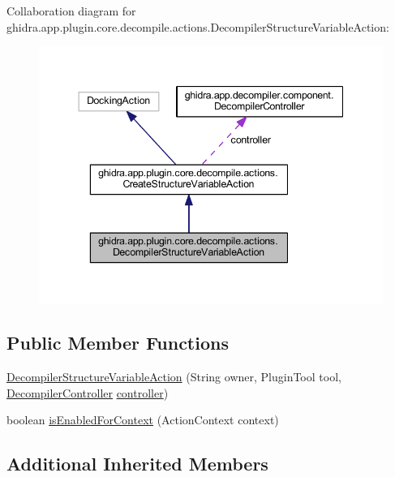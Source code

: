 Collaboration diagram for ghidra.\+app.\+plugin.\+core.\+decompile.\+actions.\+Decompiler\+Structure\+Variable\+Action\+:
\nopagebreak
\begin{figure}[H]
\begin{center}
\leavevmode
\includegraphics[width=344pt]{classghidra_1_1app_1_1plugin_1_1core_1_1decompile_1_1actions_1_1_decompiler_structure_variable_action__coll__graph}
\end{center}
\end{figure}
\subsection*{Public Member Functions}
\begin{DoxyCompactItemize}
\item 
\mbox{\hyperlink{classghidra_1_1app_1_1plugin_1_1core_1_1decompile_1_1actions_1_1_decompiler_structure_variable_action_aa98508c7959991ab9acba25a4be9258a}{Decompiler\+Structure\+Variable\+Action}} (String owner, Plugin\+Tool tool, \mbox{\hyperlink{classghidra_1_1app_1_1decompiler_1_1component_1_1_decompiler_controller}{Decompiler\+Controller}} \mbox{\hyperlink{classghidra_1_1app_1_1plugin_1_1core_1_1decompile_1_1actions_1_1_create_structure_variable_action_aa50d3c26a30df166fd5c8a1923ceea56}{controller}})
\item 
boolean \mbox{\hyperlink{classghidra_1_1app_1_1plugin_1_1core_1_1decompile_1_1actions_1_1_decompiler_structure_variable_action_ac689e3baa3a6b9ea82c2280eecf184ed}{is\+Enabled\+For\+Context}} (Action\+Context context)
\end{DoxyCompactItemize}
\subsection*{Additional Inherited Members}


